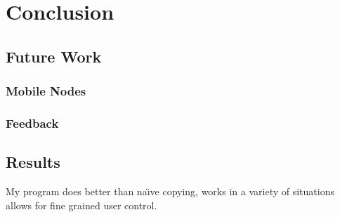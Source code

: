 \documentclass[12pt]{article}
\begin{document}
\section{Conclusion}
\subsection{Future Work}
\subsubsection{Mobile Nodes}

\subsubsection{Feedback}

\subsection{Results}
My program does better than na\"{\i}ve copying, works in a variety
of situations allows for fine grained user control.
\end{document}
